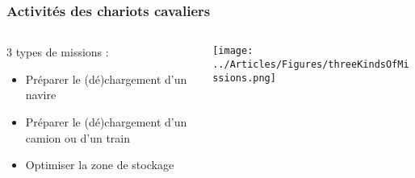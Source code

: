 \documentclass{beamer}
\begin{document}
\begin{frame}
\frametitle{Activités des chariots cavaliers}
\begin{columns}
  \begin{column}[l]{5.5cm}
	3 types de missions : 
	 \begin{itemize}
	  \item Préparer le (dé)chargement d'un \textcolor{vert}{navire}
	  \item Préparer le (dé)chargement d'un \textcolor{bleu}{camion} ou d'un \textcolor{bleu}{train}
	  \item Optimiser la zone de \textcolor{jaune}{stockage}
	\end{itemize}
\end{column}
  \begin{column}[r]{5.5cm}
	\begin{flushright}
	    \texttt{[image: ../Articles/Figures/threeKindsOfMissions.png]}
	\end{flushright}
  \end{column}
\end{columns}
\end{frame}
\end{document}
